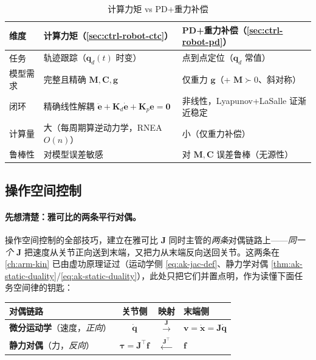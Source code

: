 \begin{table}[H]\centering\small
\caption{计算力矩 vs PD+重力补偿}
\label{tab:ctrl-ctc-vs-pd}
\begin{tabular}{p{} p{} p{}}
\toprule
维度 & 计算力矩（\cref{sec:ctrl-robot-ctc}） & PD+重力补偿（\cref{sec:ctrl-robot-pd}） \\
\midrule
任务 & 轨迹跟踪（$\mathbf{q}_d(t)$ 时变） & 点到点定位（$\mathbf{q}_d$ 常值） \\
模型需求 & 完整且精确 $\mathbf{M},\mathbf{C},\mathbf{g}$ & 仅重力 $\mathbf{g}$（+ $\mathbf{M}\succ0$、斜对称） \\
闭环 & 精确线性解耦 $\ddot{\mathbf{e}}+\mathbf{K}_d\dot{\mathbf{e}}+\mathbf{K}_p\mathbf{e}=\mathbf{0}$ & 非线性，Lyapunov+LaSalle 证渐近稳定 \\
计算量 & 大（每周期算逆动力学，RNEA $O(n)$） & 小（仅重力补偿） \\
鲁棒性 & 对模型误差敏感 & 对 $\mathbf{M},\mathbf{C}$ 误差鲁棒（无源性） \\
\bottomrule
\end{tabular}
\end{table}

\subsection{操作空间控制}
\label{sec:ctrl-robot-osc}

\paragraph{先想清楚：雅可比的两条平行对偶。}
操作空间控制的全部技巧，建立在雅可比 $\mathbf J$ 同时主管的\emph{两条}对偶链路上——\emph{同一个 $\mathbf J$} 把速度从关节正向送到末端，又把力从末端反向送回关节。这两条在 \cref{ch:arm-kin} 已由虚功原理证过（运动学侧 \cref{eq:ak-jac-def}、静力学对偶 \cref{thm:ak-static-duality}/\cref{eq:ak-static-duality}），此处只把它们并置点明，作为读懂下面任务空间律的钥匙：

\begin{center}\small
\begin{tabular}{lccl}
\toprule
对偶链路 & 关节侧 & 映射 & 末端侧 \\
\midrule
\textbf{微分运动学}（速度，\emph{正向}） & $\dot{\mathbf q}$ & $\xrightarrow{\ \mathbf J\ }$ & $\mathbf v=\dot{\mathbf x}=\mathbf J\dot{\mathbf q}$ \\
\textbf{静力对偶}（力，\emph{反向}） & $\boldsymbol\tau=\mathbf J^\top\mathbf f$ & $\xleftarrow{\ \mathbf J^\top\ }$ & $\mathbf f$ \\
\bottomrule
\end{tabular}
\end{center}

